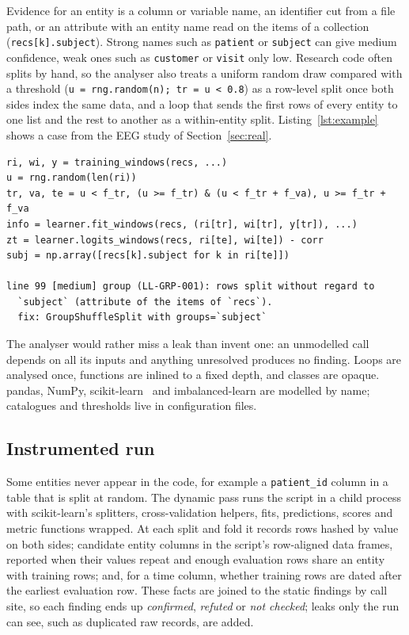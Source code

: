 \documentclass[conference]{IEEEtran}
\newcommand{\code}[1]{\texttt{#1}}
\begin{document}
Evidence for an entity is a column or variable name, an identifier cut from a file path, or an attribute with an
entity name read on the items of a collection (\code{recs[k].subject}). Strong names such as \code{patient} or
\code{subject} can give medium confidence, weak ones such as \code{customer} or \code{visit} only low. Research code
often splits by hand, so the analyser also treats a uniform random draw compared with a threshold
(\code{u = rng.random(n); tr = u < 0.8}) as a row-level split once both sides index the same data, and a loop that
sends the first rows of every entity to one list and the rest to another as a within-entity split. Listing~\ref{lst:example} shows a case from
the EEG study of Section~\ref{sec:real}.

\begin{lstlisting}[float=t, caption={Random split of 1-second EEG windows pooled over patients (shortened from the case study code) and the static finding.}, label={lst:example}, captionpos=b]
ri, wi, y = training_windows(recs, ...)
u = rng.random(len(ri))
tr, va, te = u < f_tr, (u >= f_tr) & (u < f_tr + f_va), u >= f_tr + f_va
info = learner.fit_windows(recs, (ri[tr], wi[tr], y[tr]), ...)
zt = learner.logits_windows(recs, ri[te], wi[te]) - corr
subj = np.array([recs[k].subject for k in ri[te]])

line 99 [medium] group (LL-GRP-001): rows split without regard to
  `subject` (attribute of the items of `recs`).
  fix: GroupShuffleSplit with groups=`subject`
\end{lstlisting}

The analyser would rather miss a leak than invent one: an unmodelled call depends on all its inputs and anything
unresolved produces no finding. Loops are analysed once, functions are inlined to a fixed depth, and classes are
opaque. pandas, NumPy, scikit-learn~\cite{sklearn} and imbalanced-learn are modelled by name; catalogues and
thresholds live in configuration files.

\subsection{Instrumented run}

Some entities never appear in the code, for example a \code{patient\_id} column in a table that is split at random.
The dynamic pass runs the script in a child process with scikit-learn's splitters, cross-validation helpers, fits,
predictions, scores and metric functions wrapped. At each split and fold it records rows hashed by value on both
sides; candidate entity columns in the script's row-aligned data frames, reported when their values repeat and
enough evaluation rows share an entity with training rows; and, for a time column, whether training rows are dated
after the earliest evaluation row. These facts are joined to the static findings by call site, so each finding ends
up \emph{confirmed}, \emph{refuted} or \emph{not checked}; leaks only the run can see, such as duplicated raw
records, are added.
\end{document}
